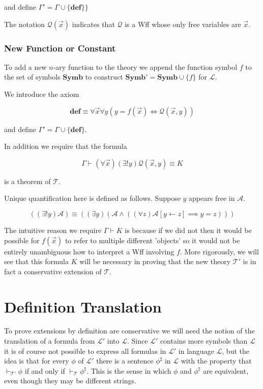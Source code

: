 \documentclass[12pt]{article}
\newcommand{\bv}[1]{\boldsymbol{#1}}
\newcommand{\mc}[1]{\mathcal{#1}}
\newcommand{\bc}[1]{\bv{\mc{#1}}}
\begin{document}
and define $\Gamma' = \Gamma \cup \{\textbf{def}\} \}$

The notation $\mc{Q}(\vec{x})$ indicates that $\mc{Q}$ is a Wff whose only free variables are $\vec{x}$.

\subsubsection*{New Function or Constant}

To add a new $n$-ary function to the theory we append the function symbol $f$ to the set of symbols $\textbf{Symb}$ to construct $\textbf{Symb}' = \textbf{Symb}\cup\{f\}$ for $\bv{\mc{L}}$.

We introduce the axiom

\begin{equation}
\textbf{def} \equiv \forall \vec{x} \forall y(y=f(\vec{x})\iff \mc{Q}(\vec{x},y))
\end{equation}

and define $\Gamma' = \Gamma \cup \{\textbf{def}\}$.

In addition we require that the formula

\begin{equation}
\Gamma \vdash (\forall \vec{x})(\exists! y) \mc{Q}(\vec{x},y) \equiv K
\end{equation}

is a theorem of $\bc{T}$.

Unique quantification here is defined as follows. Suppose $y$ appears free in $\mc{A}$.

\begin{equation}
((\exists!y)\mc{A}) \equiv ((\exists y)(\mc{A} \land ((\forall z)\mc{A}[y\leftarrow z] \implies y=z)))
\end{equation}

The intuitive reason we require $\Gamma \vdash K$ is because if we did not then it would be possible for $f(\vec{x})$ to refer to multiple different 'objects' so it would not be entirely unambiguous how to interpret a Wff involving $f$. More rigorously, we will see that this formula $K$ will be necessary in proving that the new theory $\bc{T}'$ is in fact a conservative extension of $\bc{T}$.

\section{Definition Translation}

To prove extensions by definition are conservative we will need the notion of the translation of a formula from $\bv{\mc{L}}'$ into $\bv{\mc{L}}$. Since $\bv{\mc{L}}'$ contains more symbols than $\bv{\mc{L}}$ it is of course not possible to express all formulas in $\bv{\mc{L}}'$ in language $\bv{\mc{L}}$, but the idea is that for every $\phi$ of $\bv{\mc{L}}'$ there is a sentence $\phi^\sharp$ in $\bv{\mc{L}}$ with the property that $\vdash_{\bc{T}'}\phi$ if and only if $\vdash_{\bc{T}}\phi^{\sharp}$. This is the sense in which $\phi$ and $\phi^{\sharp}$ are equivalent, even though they may be different strings.
\end{document}
